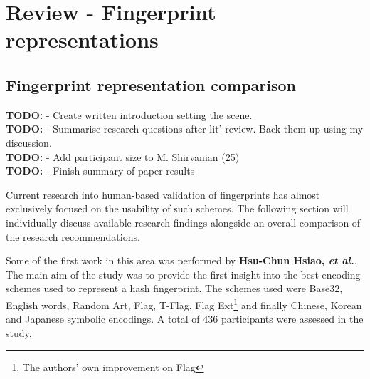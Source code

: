 \section{Review - Fingerprint representations}

\subsection{Fingerprint representation comparison}

\textbf{TODO: } - Create written introduction setting the scene.
\\\textbf{TODO: } - Summarise research questions after lit' review. Back them up using my discussion.
\\\textbf{TODO: } - Add participant size to M. Shirvanian (25)
\\\textbf{TODO: } - Finish summary of paper results


Current research into human-based validation of fingerprints has almost exclusively focused on the usability of such schemes. The following section will individually discuss available research findings alongside an overall comparison of the research recommendations.

Some of the first work in this area was performed by \textbf{Hsu-Chun Hsiao, \textit{et al.}}\cite{hsiao2009study}. The main aim of the study was to provide the first insight into the best encoding schemes used to represent a hash fingerprint. The schemes used were Base32, English words, Random Art\cite{perrig1999hash}, Flag\cite{ellison2003public}, T-Flag\cite{lin2010spate}, Flag Ext\footnote{The authors' own improvement on Flag} and finally Chinese, Korean and Japanese symbolic encodings. A total of 436 participants were assessed in the study.

